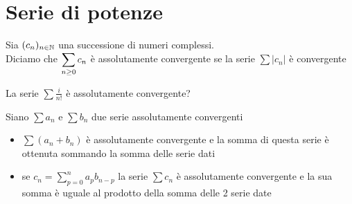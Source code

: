 \section{Serie di potenze}
\begin{defn}\bianco 
Sia $\displaystyle (c_n)_{n \in \mathbb{N}} $ una successione di numeri complessi.\\
Diciamo che $\displaystyle \sum_{n\geq 0} c_n$ \`e assolutamente convergente se la serie $\sum \vert c_n \vert$ \`e convergente
\end{defn}
\begin{ex}La serie $\sum\frac{i}{n!}$ \`e assolutamente convergente?
\end{ex}
\begin{prop}Siano $\sum a_n$ e $\sum b_n$ due serie assolutamente convergenti 
\begin{itemize}
\item $\sum (a_n + b_n) $ \`e assolutamente convergente e la somma di questa serie \`e ottenuta sommando la somma delle serie dati 
\item se $c_n =\sum_{p=0}^ n a_p b_{n-p}$ la serie $\sum c_n$ \`e assolutamente convergente e la sua somma \`e uguale al prodotto della somma delle 2 serie date
\end{itemize}
\end{prop}

